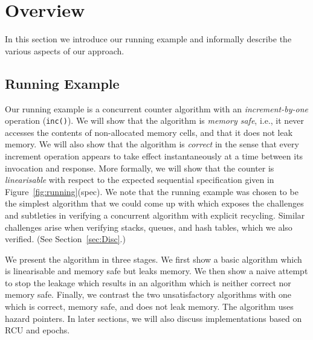 %
%

\section{Overview\label{sec:Overview}}

In this section we introduce our running example and 
informally describe the various aspects of our approach.

\subsection{Running Example}

Our running example is a concurrent counter algorithm with an
\emph{increment-by-one} operation (\texttt{inc()}).
We will show that the algorithm is \emph{memory safe}, i.e., it never accesses 
the contents of non-allocated memory cells, 
and that it does not leak memory.
We will also show that the algorithm is \emph{correct} in the sense that
every increment operation appears 
to take effect instantaneously at a time between  its invocation and response.
More formally, we will show that the  counter is \emph{linearisable} with respect to the 
expected sequential specification given in Figure~\ref{fig:running}(spec).
We note that the running example was chosen to be the simplest algorithm that we could come up with 
which exposes the    
challenges and subtleties in verifying a concurrent algorithm with explicit 
recycling. 
Similar challenges arise when verifying stacks, queues, and hash tables, 
which we also verified. (See Section~\ref{sec:Disc}.)

We present the algorithm in three stages.
We first show a basic algorithm which is linearisable and memory safe 
but leaks memory. 
We then show a naive attempt to stop the leakage which results in an algorithm which is
neither correct nor memory safe.
Finally, we  contrast the two unsatisfactory algorithms with 
one which is correct, memory safe, and does not leak memory.
The algorithm uses hazard pointers.
In later sections, we will also discuss implementations based on RCU and epochs. 

 


